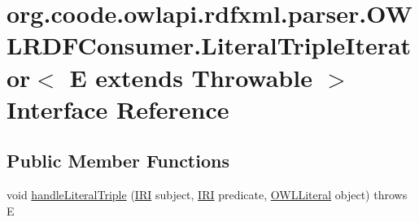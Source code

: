 \hypertarget{interfaceorg_1_1coode_1_1owlapi_1_1rdfxml_1_1parser_1_1_o_w_l_r_d_f_consumer_1_1_literal_triple_72e43583cd8bf74f09ef2063bc222d8f}{\section{org.\-coode.\-owlapi.\-rdfxml.\-parser.\-O\-W\-L\-R\-D\-F\-Consumer.\-Literal\-Triple\-Iterator$<$ E extends Throwable $>$ Interface Reference}
\label{interfaceorg_1_1coode_1_1owlapi_1_1rdfxml_1_1parser_1_1_o_w_l_r_d_f_consumer_1_1_literal_triple_72e43583cd8bf74f09ef2063bc222d8f}
}
\subsection*{Public Member Functions}
\begin{DoxyCompactItemize}
\item 
void \hyperlink{interfaceorg_1_1coode_1_1owlapi_1_1rdfxml_1_1parser_1_1_o_w_l_r_d_f_consumer_1_1_literal_triple_72e43583cd8bf74f09ef2063bc222d8f_a5d9bd2021f0a1b0c5a5380e3efdd7af5}{handle\-Literal\-Triple} (\hyperlink{classorg_1_1semanticweb_1_1owlapi_1_1model_1_1_i_r_i}{I\-R\-I} subject, \hyperlink{classorg_1_1semanticweb_1_1owlapi_1_1model_1_1_i_r_i}{I\-R\-I} predicate, \hyperlink{interfaceorg_1_1semanticweb_1_1owlapi_1_1model_1_1_o_w_l_literal}{O\-W\-L\-Literal} object)  throws E
\end{DoxyCompactItemize}



